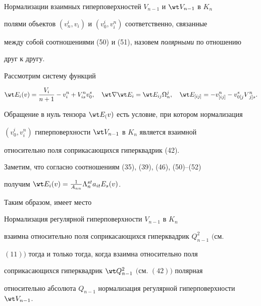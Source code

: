  


Нормализации взаимных гиперповерхностей $V_{n-1}$ и $\wt V_{n-1}$ в $K_n$ 


полями объектов $(v^i_n,v_i)$ и $(v^i_0,v^n_i)$ соответственно, связанные 


между собой соотношениями (50) и (51), назовем {\it полярными} по отношению 


друг к другу. 


 


Рассмотрим систему функций 


\begin{equation} 


\wt E_i(v)=\frac{V_i}{n+1}-v^n_i+V^n_{is}v^s_0,\quad 


\wt\nabla\wt E_i=\wt E_{ij}\Omega^j_n,\quad \wt E_{[ij]}= 


-v^n_{[ij]}-v{}^s_{0[j}V{}^n_{j]s}. 


\end{equation} 


Обращение в нуль тензора $\wt E_(v)$ есть условие, при котором нормализация 


$(v^i_0,v^n_i)$ гиперповерхности $\wt V_{n-1}$ в $K_n$ является взаимной 


относительно поля соприкасающихся гиперквадрик (42). 


 


Заметим, что согласно соотношениям (35), (39), (46), (50)--(52) 


получим $\wt E_i(v)=\frac{1}{A_{nn}}\Lambda^{st}_n a_{it}E_s(v)$. 


 


Таким образом, имеет место 


 


\begin{thm} 


Нормализация регулярной гиперповерхности $V_{n-1}$ в $K_n$ 


взаимна относительно поля соприкасающихся гиперквадрик $Q^2_{n-1}$ $($см. 


$(11))$ тогда и только тогда, когда взаимна относительно поля 


соприкасающихся гиперквадрик $\wt Q^2_{n-1}$ $($см. $(42))$ полярная 


относительно абсолюта $Q_{n-1}$ нормализация регулярной гиперповерхности $\wt 


V_{n-1}$. 


\end{thm} 


